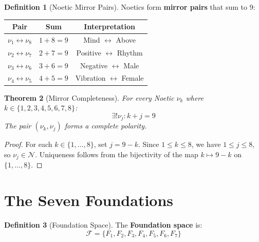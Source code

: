 \documentclass[11pt,twoside,openright]{book}
\theoremstyle{definition}
\newtheorem{definition}{Definition}[chapter]
\theoremstyle{plain}
\newtheorem{theorem}[definition]{Theorem}
\theoremstyle{remark}
\newcommand{\Noetics}{\mathcal{N}}
\newcommand{\Foundations}{\mathcal{F}}
\newcommand{\noe}[1]{\nu_{#1}}
\begin{document}
\begin{definition}[Noetic Mirror Pairs]
\label{def:mirror-pairs}
Noetics form \textbf{mirror pairs} that sum to 9:
\begin{center}
\begin{tabular}{ccc}
\toprule
\textbf{Pair} & \textbf{Sum} & \textbf{Interpretation} \\
\midrule
$\noe{1} \leftrightarrow \noe{8}$ & $1 + 8 = 9$ & Mind $\leftrightarrow$ Above \\
$\noe{2} \leftrightarrow \noe{7}$ & $2 + 7 = 9$ & Positive $\leftrightarrow$ Rhythm \\
$\noe{3} \leftrightarrow \noe{6}$ & $3 + 6 = 9$ & Negative $\leftrightarrow$ Male \\
$\noe{4} \leftrightarrow \noe{5}$ & $4 + 5 = 9$ & Vibration $\leftrightarrow$ Female \\
\bottomrule
\end{tabular}
\end{center}
\end{definition}

\begin{theorem}[Mirror Completeness]
\label{thm:mirror-completeness}
For every Noetic $\noe{k}$ where $k \in \{1,2,3,4,5,6,7,8\}$:
\[
\exists! \noe{j} : k + j = 9
\]
The pair $(\noe{k}, \noe{j})$ forms a complete polarity.
\end{theorem}

\begin{proof}
For each $k \in \{1,\ldots,8\}$, set $j = 9 - k$. Since $1 \leq k \leq 8$, we have $1 \leq j \leq 8$, so $\noe{j} \in \Noetics$. Uniqueness follows from the bijectivity of the map $k \mapsto 9-k$ on $\{1,\ldots,8\}$.
\end{proof}

\section{The Seven Foundations}

\begin{definition}[Foundation Space]
\label{def:foundation-space}
The \textbf{Foundation space} is:
\[
\Foundations = \{F_1, F_2, F_3, F_4, F_5, F_6, F_7\}
\]
\end{definition}
\end{document}
